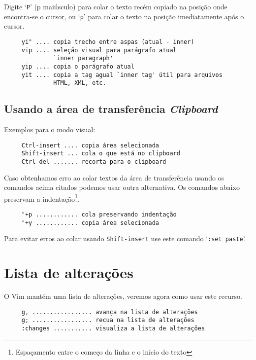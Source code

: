 Digite `{\tt P}' (p maiúsculo) para colar o texto recém copiado na posição onde
encontra-se o cursor, ou `{\tt p}' para colar o texto na posição imediatamente
após o cursor.

\begin{verbatim}
     yi" .... copia trecho entre aspas (atual - inner)
     vip .... seleção visual para parágrafo atual 
              `inner paragraph'
     yip .... copia o parágrafo atual
     yit .... copia a tag agual `inner tag' útil para arquivos 
              HTML, XML, etc.
\end{verbatim}

\subsection{Usando a área de transferência {\em Clipboard}}

Exemplos para o modo visual:

\begin{verbatim}
     Ctrl-insert .... copia área selecionada 
     Shift-insert ... cola o que está no clipboard
     Ctrl-del ....... recorta para o clipboard
\end{verbatim}

Caso obtenhamos erro ao colar textos da área de transferência usando os
comandos acima citados podemos usar outra alternativa.  Os comandos abaixo
preservam a indentação\footnote{Espaçamento entre o começo da linha e o início
do texto}.

\begin{verbatim}
     "+p ............ cola preservando indentação
     "+y ............ copia área selecionada
\end{verbatim}

{\Large {}} Para evitar erros ao colar usando {\tt Shift-insert} 
use este comando `{\tt :set paste}'.


\section{Lista de alterações}

O Vim mantém uma lista de alterações, veremos agora como usar este recurso.

\begin{verbatim}
     g, ................. avança na lista de alterações
     g; ................. recua na lista de alterações
     :changes ........... visualiza a lista de alterações
\end{verbatim}

